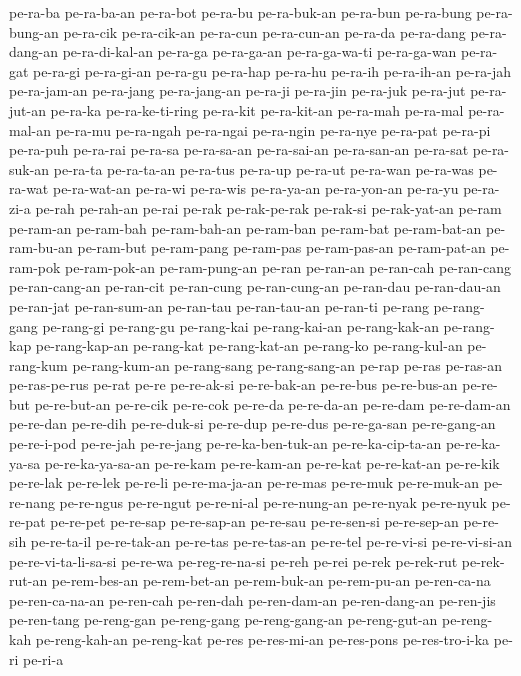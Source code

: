 {pe-ra-ba pe-ra-ba-an pe-ra-bot pe-ra-bu pe-ra-buk-an pe-ra-bun pe-ra-bung
pe-ra-bung-an pe-ra-cik pe-ra-cik-an pe-ra-cun pe-ra-cun-an pe-ra-da
pe-ra-dang pe-ra-dang-an pe-ra-di-kal-an pe-ra-ga pe-ra-ga-an
pe-ra-ga-wa-ti pe-ra-ga-wan pe-ra-gat pe-ra-gi pe-ra-gi-an pe-ra-gu
pe-ra-hap pe-ra-hu pe-ra-ih pe-ra-ih-an pe-ra-jah pe-ra-jam-an pe-ra-jang
pe-ra-jang-an pe-ra-ji pe-ra-jin pe-ra-juk pe-ra-jut pe-ra-jut-an pe-ra-ka
pe-ra-ke-ti-ring pe-ra-kit pe-ra-kit-an pe-ra-mah pe-ra-mal pe-ra-mal-an
pe-ra-mu pe-ra-ngah pe-ra-ngai pe-ra-ngin pe-ra-nye pe-ra-pat pe-ra-pi
pe-ra-puh pe-ra-rai pe-ra-sa pe-ra-sa-an pe-ra-sai-an pe-ra-san-an
pe-ra-sat pe-ra-suk-an pe-ra-ta pe-ra-ta-an pe-ra-tus pe-ra-up pe-ra-ut
pe-ra-wan pe-ra-was pe-ra-wat pe-ra-wat-an pe-ra-wi pe-ra-wis pe-ra-ya-an
pe-ra-yon-an pe-ra-yu pe-ra-zi-a pe-rah pe-rah-an pe-rai pe-rak
pe-rak-pe-rak pe-rak-si pe-rak-yat-an pe-ram pe-ram-an pe-ram-bah
pe-ram-bah-an pe-ram-ban pe-ram-bat pe-ram-bat-an pe-ram-bu-an pe-ram-but
pe-ram-pang pe-ram-pas pe-ram-pas-an pe-ram-pat-an pe-ram-pok
pe-ram-pok-an pe-ram-pung-an pe-ran pe-ran-an pe-ran-cah pe-ran-cang
pe-ran-cang-an pe-ran-cit pe-ran-cung pe-ran-cung-an pe-ran-dau
pe-ran-dau-an pe-ran-jat pe-ran-sum-an pe-ran-tau pe-ran-tau-an pe-ran-ti
pe-rang pe-rang-gang pe-rang-gi pe-rang-gu pe-rang-kai pe-rang-kai-an
pe-rang-kak-an pe-rang-kap pe-rang-kap-an pe-rang-kat pe-rang-kat-an
pe-rang-ko pe-rang-kul-an pe-rang-kum pe-rang-kum-an pe-rang-sang
pe-rang-sang-an pe-rap pe-ras pe-ras-an pe-ras-pe-rus pe-rat pe-re
pe-re-ak-si pe-re-bak-an pe-re-bus pe-re-bus-an pe-re-but pe-re-but-an
pe-re-cik pe-re-cok pe-re-da pe-re-da-an pe-re-dam pe-re-dam-an pe-re-dan
pe-re-dih pe-re-duk-si pe-re-dup pe-re-dus pe-re-ga-san pe-re-gang-an
pe-re-i-pod pe-re-jah pe-re-jang pe-re-ka-ben-tuk-an pe-re-ka-cip-ta-an
pe-re-ka-ya-sa pe-re-ka-ya-sa-an pe-re-kam pe-re-kam-an pe-re-kat
pe-re-kat-an pe-re-kik pe-re-lak pe-re-lek pe-re-li pe-re-ma-ja-an
pe-re-mas pe-re-muk pe-re-muk-an pe-re-nang pe-re-ngus pe-re-ngut
pe-re-ni-al pe-re-nung-an pe-re-nyak pe-re-nyuk pe-re-pat pe-re-pet
pe-re-sap pe-re-sap-an pe-re-sau pe-re-sen-si pe-re-sep-an pe-re-sih
pe-re-ta-il pe-re-tak-an pe-re-tas pe-re-tas-an pe-re-tel pe-re-vi-si
pe-re-vi-si-an pe-re-vi-ta-li-sa-si pe-re-wa pe-reg-re-na-si pe-reh pe-rei
pe-rek pe-rek-rut pe-rek-rut-an pe-rem-bes-an pe-rem-bet-an pe-rem-buk-an
pe-rem-pu-an pe-ren-ca-na pe-ren-ca-na-an pe-ren-cah pe-ren-dah
pe-ren-dam-an pe-ren-dang-an pe-ren-jis pe-ren-tang pe-reng-gan
pe-reng-gang pe-reng-gang-an pe-reng-gut-an pe-reng-kah pe-reng-kah-an
pe-reng-kat pe-res pe-res-mi-an pe-res-pons pe-res-tro-i-ka pe-ri pe-ri-a
}

